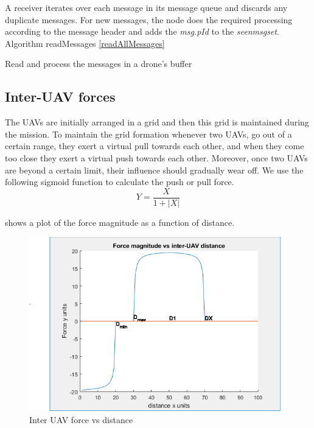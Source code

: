 A receiver iterates over each message in its message queue and discards any duplicate messages. For new messages, the node does the required processing according to the message header and adds the \emph{msg.pId} to the \emph{seen\textunderscore msg\textunderscore set}. Algorithm readMessages \ref{readAllMessages}

\begin{algorithm}
    \caption{Read and process the messages in a drone's buffer} 
    \label{readAllMessages}
    \DontPrintSemicolon
    
\end{algorithm}

\subsection{Inter-UAV forces}
The UAVs are initially arranged in a grid and then this grid is maintained during the mission. To maintain the grid formation whenever two UAVs, go out of a certain range, they exert a virtual pull towards each other, and when they come too close they exert a virtual push towards each other. Moreover, once two UAVs are beyond a certain limit, their influence should gradually wear off. We use the following sigmoid function to calculate the push or pull force. 
\begin{equation}
    Y = \frac{X}{1 + |X|}
\end{equation}

 shows a plot of the force magnitude as a function of distance.

\begin{figure}
\centering
\includegraphics[width=1\textwidth]{ncsuthesis-0.6/Chapter-4/figs/force_function}
\caption{Inter UAV force vs distance}
\label{fig:force_fn}
\end{figure}

